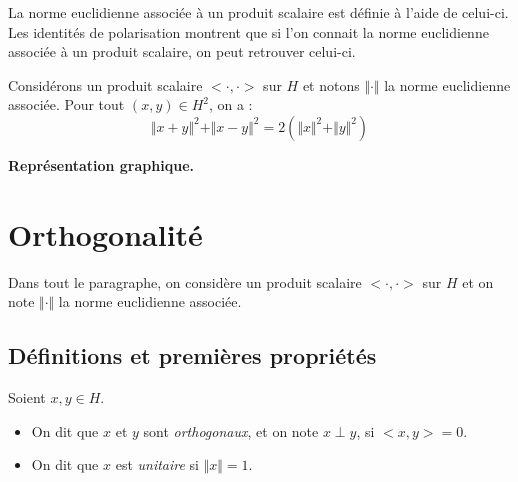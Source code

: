 \documentclass[a4paper,10pt]{report}
\begin{document}
\begin{preuve} 

\vspace{6cm}
\end{preuve}

\begin{rem} La norme euclidienne associée à un produit scalaire est définie à l'aide de celui-ci. Les identités de polarisation montrent que si l'on connait la norme euclidienne associée à un produit scalaire, on peut retrouver celui-ci.
\end{rem}

\begin{prop}
Considérons un produit scalaire $< \cdot , \cdot>$ sur $H$ et notons $\Vert \cdot \Vert$ la norme euclidienne associée. Pour tout $(x,y) \in H^2$, on a :
$$ \Vert x+y \Vert^2 + \Vert x-y \Vert^2 = 2 (\Vert x \Vert^2 + \Vert y \Vert^2)$$
\end{prop}

\begin{center}
\textbf{Représentation graphique.}
\end{center}

\vspace{3cm}

\begin{preuve}

\end{preuve}
\newpage

\section{Orthogonalité}
\noindent Dans tout le paragraphe, on considère un produit scalaire $< \cdot , \cdot>$ sur $H$ et on note $\Vert \cdot \Vert$ la norme euclidienne associée.

\subsection{Définitions et premières propriétés}

\begin{defin} Soient $x,y \in H$.
\begin{itemize}
\item On dit que $x$ et $y$ sont \textit{orthogonaux}, et on note $x \perp y$, si $<x,y>=0$.
\item On dit que $x$ est \textit{unitaire} si $\Vert x \Vert =1$.
\end{itemize}
\end{defin}
\end{document}
